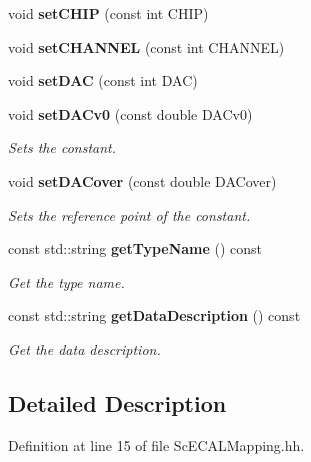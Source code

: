 \begin{DoxyCompactItemize}
\item 
void {\bfseries setCHIP} (const int CHIP)\label{classCALICE_1_1ScECALMapping_af40ccfc4881e4b72aea5cccfaab951f6}

\item 
void {\bfseries setCHANNEL} (const int CHANNEL)\label{classCALICE_1_1ScECALMapping_adbc2b03d78b1418f77728837a94ded6b}

\item 
void {\bfseries setDAC} (const int DAC)\label{classCALICE_1_1ScECALMapping_a364c50c2fc937719ba399528001bf87b}

\item 
void {\bf setDACv0} (const double DACv0)\label{classCALICE_1_1ScECALMapping_a33b77ebafb781d5a4700c59660db3f29}

\begin{DoxyCompactList}\small\item\em Sets the constant. \item\end{DoxyCompactList}\item 
void {\bf setDACover} (const double DACover)\label{classCALICE_1_1ScECALMapping_a8885719390a5f0c9e933f223f2eb791f}

\begin{DoxyCompactList}\small\item\em Sets the reference point of the constant. \item\end{DoxyCompactList}\item 
const std::string {\bf getTypeName} () const 
\begin{DoxyCompactList}\small\item\em Get the type name. \item\end{DoxyCompactList}\item 
const std::string {\bf getDataDescription} () const 
\begin{DoxyCompactList}\small\item\em Get the data description. \item\end{DoxyCompactList}\end{DoxyCompactItemize}


\subsection{Detailed Description}


Definition at line 15 of file ScECALMapping.hh.

